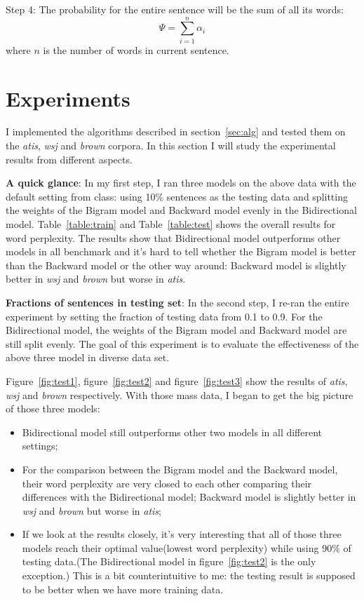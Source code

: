 \documentclass[10pt]{article}
\begin{document}
Step 4: The probability for the entire sentence will be the sum of all its words:
\[
   \Psi = \sum_{i=1}^{n}{ \alpha_{i}}
\]
 where $n$ is the number of words in current sentence.
\section{Experiments}\label{sec:exp}

I implemented the algorithms described in section~\ref{sec:alg} and tested them on the \emph{atis}, \emph{wsj} and \emph{brown} corpora. In this section I will study the experimental results from different aspects.

\textbf{A quick glance}: In my first step, I ran three models on the above data with the default setting from class: using 10\% sentences as the testing data and splitting the weights of the Bigram model and Backward model evenly in the Bidirectional model. Table~\ref{table:train} and Table~\ref{table:test} shows the overall results for word perplexity. The results show that Bidirectional model outperforms other models in all benchmark and it's hard to tell whether the Bigram model is better than the Backward model or the other way around: Backward model is slightly better in \emph{wsj} and \emph{brown} but worse in \emph{atis}.

\textbf{Fractions of sentences in testing set}: In the second step, I re-ran the entire experiment by setting the fraction of testing data from 0.1 to 0.9. For the Bidirectional model, the weights of the Bigram model and Backward model are still split evenly. The goal of this experiment is to evaluate the effectiveness of the above three model in diverse data set.

Figure~\ref{fig:test1}, figure~\ref{fig:test2} and figure~\ref{fig:test3} show the results of \emph{atis}, \emph{wsj} and \emph{brown} respectively. With those mass data, I began to get the big picture of those three models:

\begin{itemize}
  \item Bidirectional model still outperforms other two models in all different settings;
  \item For the comparison between the Bigram model and the Backward model, their word perplexity are very closed to each other comparing their differences with the Bidirectional model; Backward model is slightly better in \emph{wsj} and \emph{brown} but worse in \emph{atis};
  \item If we look at the results closely, it's very interesting that all of those three models reach their optimal value(lowest word perplexity) while using 90\% of testing data.(The Bidirectional model in figure~\ref{fig:test2} is the only exception.) This is a bit counterintuitive to me: the testing result is supposed to be better when we have more training data.
\end{itemize}
\end{document}

